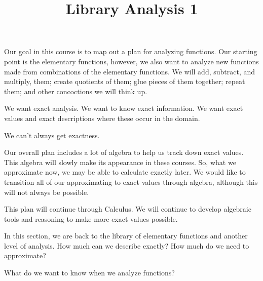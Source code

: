 \documentclass{ximera}
\title{Library Analysis 1}
\begin{document}
\begin{abstract}
\end{abstract}
\maketitle


Our goal in this course is to map out a plan for analyzing functions.  Our starting point is the elementary functions, however, we also want to analyze new functions made from combinations of the elementary functions.  We will add, subtract, and multiply, them; create quotients of them; glue pieces of them together; repeat them; and other concoctions we will think up.

We want exact analysis.  We want to know exact information.  We want exact values and exact descriptions where these occur in the domain.

We can't always get exactness. 

Our overall plan includes a lot of algebra to help us track down exact values.  This algebra will slowly make its appearance in these courses.  So, what we approximate now, we may be able to calculate exactly later.  We would like to transition all of our approximating to exact values through algebra, although this will not always be possible.

This plan will continue through Calculus.  We will continue to develop algebraic tools and reasoning to make more exact values possible.

In this section, we are back to the library of elementary functions and another level of analysis.  How much can we describe exactly? How much do we need to approximate?


What do we want to know when we analyze functions?
\end{document}
